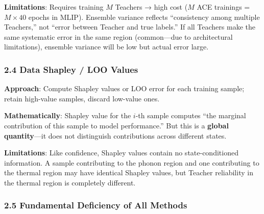 \documentclass[
  12pt,
]{article}
\begin{document}
\textbf{Limitations}: Requires training $M$ Teachers → high cost ($M$ ACE trainings = $M \times 40$ epochs in MLIP). Ensemble variance reflects ``consistency among multiple Teachers,'' not ``error between Teacher and true labels.'' If all Teachers make the same systematic error in the same region (common---due to architectural limitations), ensemble variance will be low but actual error large.

\subsubsection{2.4 Data Shapley / LOO Values}\label{data-shapley-loo-values}

\textbf{Approach}: Compute Shapley values or LOO error for each training sample; retain high-value samples, discard low-value ones.

\textbf{Mathematically}: Shapley value for the $i$-th sample computes ``the marginal contribution of this sample to model performance.'' But this is a \textbf{global quantity}---it does not distinguish contributions across different states.

\textbf{Limitations}: Like confidence, Shapley values contain no state-conditioned information. A sample contributing to the phonon region and one contributing to the thermal region may have identical Shapley values, but Teacher reliability in the thermal region is completely different.

\subsubsection{2.5 Fundamental Deficiency of All Methods}\label{fundamental-deficiency}
\end{document}
